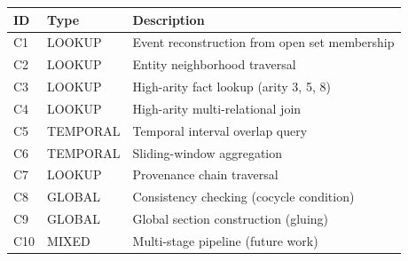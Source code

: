 \begin{tabular}{@{}llp{6cm}@{}}
\toprule
ID & Type & Description \\
\midrule
C1 & LOOKUP & Event reconstruction from open set membership \\
C2 & LOOKUP & Entity neighborhood traversal \\
C3 & LOOKUP & High-arity fact lookup (arity 3, 5, 8) \\
C4 & LOOKUP & High-arity multi-relational join \\
C5 & TEMPORAL & Temporal interval overlap query \\
C6 & TEMPORAL & Sliding-window aggregation \\
C7 & LOOKUP & Provenance chain traversal \\
C8 & GLOBAL & Consistency checking (cocycle condition) \\
C9 & GLOBAL & Global section construction (gluing) \\
C10 & MIXED & Multi-stage pipeline (future work) \\
\bottomrule
\end{tabular}
